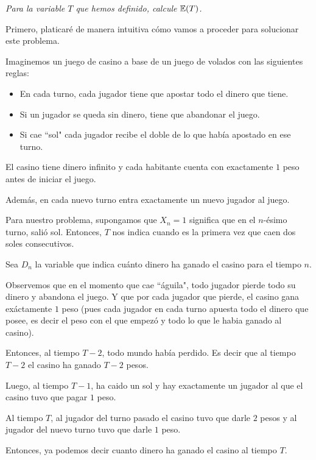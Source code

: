 \emph
{
	Para la variable $T$ que hemos definido, calcule $\mathbb{E}\! \left( T \right)$.
}\pn

\afterstatement

	Primero, platicaré de manera intuitiva cómo vamos a proceder para solucionar este problema.\pn

	Imaginemos un juego de casino a base de un juego de volados con las siguientes reglas:\pn
    
	\begin{itemize}
			\item En cada turno, cada jugador tiene que apostar todo el dinero que tiene.
			\item Si un jugador se queda sin dinero, tiene que abandonar el juego.
			\item Si cae ``sol" cada jugador recibe el doble de lo que había apostado en ese turno.  
	\end{itemize}\pn
   
	El casino tiene dinero infinito y cada habitante cuenta con exactamente $1$ peso antes de
	iniciar el juego.\pn
   
	Además, en cada nuevo turno entra exactamente un nuevo jugador al juego.\pn
   
	Para nuestro problema, supongamos que $X_n = 1$ significa que en el $n$-ésimo turno, salió sol.
	Entonces, $T$ nos indica cuando es la primera vez que caen dos soles consecutivos.\pn
   
	Sea $D_n$ la variable que indica cuánto dinero ha ganado el casino para el tiempo $n$.\pn
   
	Observemos que en el momento que cae ``águila", todo jugador pierde todo su dinero y abandona el juego.
	Y que por cada jugador que pierde, el casino gana exáctamente $1$ peso (pues cada jugador en cada
	turno apuesta todo el dinero que posee, es decir el peso con el que empezó y todo lo que le habia
	ganado al casino).\pn
   
	Entonces, al tiempo $T-2$, todo mundo había perdido. Es decir que al tiempo $T-2$ el casino ha ganado
	$T-2$ pesos.\pn
   
	Luego, al tiempo $T-1$, ha caido un sol y hay exactamente un jugador al que el casino tuvo 
	que pagar $1$ peso.\pn
   
	Al tiempo $T$, al jugador del turno pasado el casino tuvo que darle $2$ pesos y al jugador del nuevo
	turno tuvo que darle $1$ peso.\pn
   
	Entonces, ya podemos decir cuanto dinero ha ganado el casino al tiempo $T$.
	
